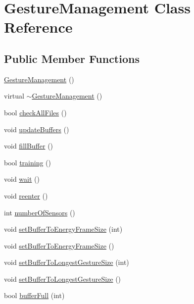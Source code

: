 \hypertarget{classGestureManagement}{
\section{GestureManagement Class Reference}
\label{classGestureManagement}
}
\subsection*{Public Member Functions}
\begin{DoxyCompactItemize}
\item 
\hyperlink{classGestureManagement_add53dee17bdb4dc327d3a765fe54dab4}{GestureManagement} ()
\item 
virtual \hyperlink{classGestureManagement_ab4185a887ea40273198ac71b2ecb6bf1}{$\sim$GestureManagement} ()
\item 
bool \hyperlink{classGestureManagement_a7c776e3376dff513610ba4bf82cae796}{checkAllFiles} ()
\item 
void \hyperlink{classGestureManagement_aab8a8955b83bf07a872c458c2364d8fd}{updateBuffers} ()
\item 
void \hyperlink{classGestureManagement_aa9c5c851135b6c6f71201daa8bbcfe60}{fillBuffer} ()
\item 
bool \hyperlink{classGestureManagement_a7457d89ad122f30c74830cc237ba0677}{training} ()
\item 
void \hyperlink{classGestureManagement_a618ae355936c297079a3da77ee83f82f}{wait} ()
\item 
void \hyperlink{classGestureManagement_a0378e17242d054c60f7cfc21c80ba3a3}{reenter} ()
\item 
int \hyperlink{classGestureManagement_a97421724eb23c9b576a731ab084410da}{numberOfSensors} ()
\item 
void \hyperlink{classGestureManagement_aceff487c58b7a4e7a837b75207d6cf6e}{setBufferToEnergyFrameSize} (int)
\item 
void \hyperlink{classGestureManagement_ab5648ffc34fad5ab03d9c45c30d54196}{setBufferToEnergyFrameSize} ()
\item 
void \hyperlink{classGestureManagement_a3b2b18a390a23ea7a3e355d339945242}{setBufferToLongestGestureSize} (int)
\item 
void \hyperlink{classGestureManagement_a05cef685ea73cd6ec086c8f98a26cc66}{setBufferToLongestGestureSize} ()
\item 
bool \hyperlink{classGestureManagement_afad51301bfe33276f8f04e826aa61d41}{bufferFull} (int)
\item 

\end{DoxyCompactItemize}
